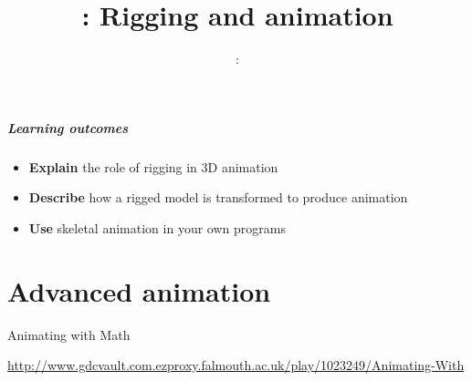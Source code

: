 \usepackage{../../beamerthemeFalmouthGamesAcademy}
\usepackage{multimedia}
\graphicspath{ {../../} }


\usepackage[normalem]{ulem}
\usepackage{wasysym}

\usepackage{pdfpages}

\usetikzlibrary{arrows,automata}




\title{\sessionnumber: Rigging and animation}
\subtitle{\modulecode: \moduletitle}

\frame{\titlepage} 

\begin{frame}
	\frametitle{Learning outcomes}
	\begin{itemize}
		\item \textbf{Explain} the role of rigging in 3D animation
		\item \textbf{Describe} how a rigged model is transformed to produce animation
		\item \textbf{Use} skeletal animation in your own programs
	\end{itemize}
\end{frame}




\part{Advanced animation}
\frame{\partpage}

\begin{frame}{Animating with Math}
	\begin{center}
		\url{http://www.gdcvault.com.ezproxy.falmouth.ac.uk/play/1023249/Animating-With}
	\end{center}
\end{frame}


